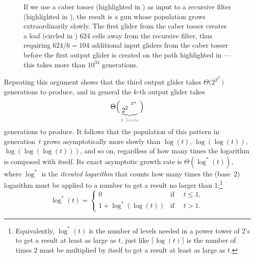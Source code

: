 \begin{figure}[!htb]
	\centering
	\caption{If we use a caber tosser (highlighted in ) as input to a recursive filter (highlighted in ), the result is a gun whose population grows extraordinarily slowly. The first glider from the caber tosser creates a loaf (circled in ) $624$ cells away from the recursive filter, thus requiring $624/6 = 104$ additional input gliders from the caber tosser before the first output glider is created on the path highlighted in ---this takes more than $10^{34}$ generations.}\label{fig:recursive_filter_caber}
\end{figure}

Repeating this argument shows that the third output glider takes $\Theta\big(2^{2^{2^n}}\big)$ generations to produce, and in general the $k$-th output glider takes
\[
	\raisebox{0.18cm}{$\displaystyle\Theta\Big($}\begingroup\color{gray}\underbrace{{\color{black}2^{2^{\cdot^{\cdot^{2^n}}}}}}_{\text{\color{gray}$k$ levels}}\endgroup\raisebox{0.18cm}{$\displaystyle\Big)$}
\]
generations to produce. It follows that the population of this pattern in generation~$t$ grows asymptotically more slowly than $\log(t)$, $\log(\log(t))$, $\log(\log(\log(t)))$, and so on, regardless of how many times the logarithm is composed with itself. Its exact asymptotic growth rate is $\Theta(\log^*(t))$, where $\log^*$ is the \emph{iterated logarithm} that counts how many times the (base~$2$) logarithm must be applied to a number to get a result no larger than $1$:\footnote{Equivalently, $\log^*(t)$ is the number of levels needed in a power tower of $2$'s to get a result at least as large as $t$, just like $\lceil\log(t)\rceil$ is the number of times $2$ must be multiplied by itself to get a result at least as large as $t$.}
\[
	\log^*(t) = \begin{cases}
		0                  & \mbox{if } \quad t \leq 1, \\
		1 + \log^*(\log(t)) & \mbox{if } \quad t > 1.
	\end{cases}
\]

